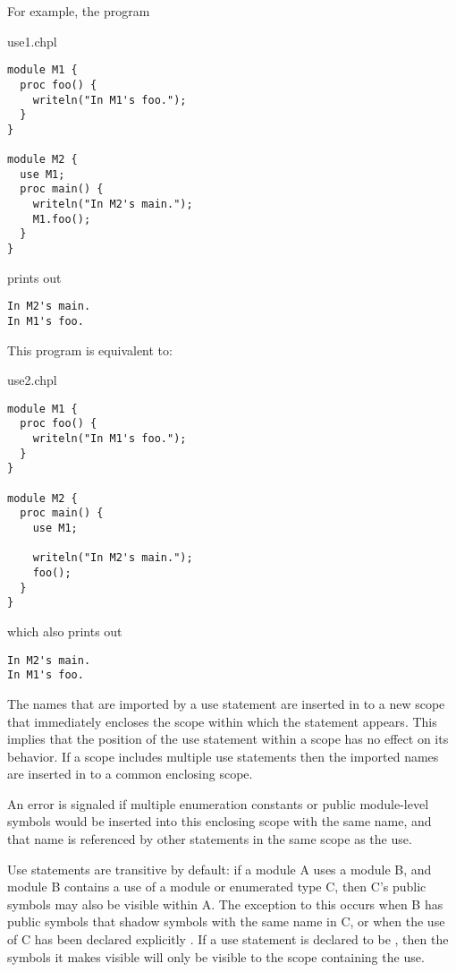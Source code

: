 For example, the program
\begin{chapelexample}{use1.chpl}
\begin{chapel}
\begin{verbatim}
module M1 {
  proc foo() {
    writeln("In M1's foo.");
  }
}

module M2 {
  use M1;
  proc main() {
    writeln("In M2's main.");
    M1.foo();
  }
}
\end{verbatim}
\end{chapel}
prints out
\begin{chapelprintoutput}
\begin{verbatim}
In M2's main.
In M1's foo.
\end{verbatim}
\end{chapelprintoutput}
\end{chapelexample}

This program is equivalent to:
\begin{chapelexample}{use2.chpl}
\begin{chapel}
\begin{verbatim}
module M1 {
  proc foo() {
    writeln("In M1's foo.");
  }
}

module M2 {
  proc main() {
    use M1;

    writeln("In M2's main.");
    foo();
  }
}
\end{verbatim}
\end{chapel}

which also prints out
\begin{chapelprintoutput}
\begin{verbatim}
In M2's main.
In M1's foo.
\end{verbatim}
\end{chapelprintoutput}
\end{chapelexample}

The names that are imported by a use statement are inserted in to a
new scope that immediately encloses the scope within which the
statement appears.  This implies that the position of the use
statement within a scope has no effect on its behavior.  If a scope
includes multiple use statements then the imported names are inserted
in to a common enclosing scope.

An error is signaled if multiple enumeration constants or public module-level
symbols would be inserted into this enclosing scope with the same name, and
that name is referenced by other statements in the same scope as the use.


Use statements are transitive by default: if a module A uses a module B, and
module B contains a use of a module or enumerated type C, then C's public
symbols may also be visible within A.  The exception to this occurs when B has
public symbols that shadow symbols with the same name in C, or when the use of C
has been declared explicitly .  If a use statement is declared to
be , then the symbols it makes visible will only be visible to the
scope containing the use.

